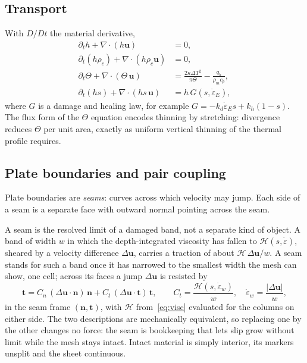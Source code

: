 \documentclass[11pt]{article}
\newcommand{\vect}[1]{\mathbf{#1}}
\newcommand{\edot}{\dot{\varepsilon}}
\newcommand{\Hint}{\mathcal{H}}
\begin{document}
\subsection{Transport}
With $D/Dt$ the material derivative,
\begin{align}
  \partial_t h + \nabla\cdot(h\vect{u}) &= 0,\\
  \partial_t (h\rho_c) + \nabla\cdot(h\rho_c\vect{u}) &= 0,\\
  \partial_t \Theta + \nabla\cdot(\Theta\,\vect{u}) &= \frac{2\kappa\Delta T^2}{\pi\Theta} - \frac{q_b}{\rho_m c_p},\\
  \partial_t (hs) + \nabla\cdot(hs\,\vect{u}) &= h\,G(s,\edot_E),
\end{align}
where $G$ is a damage and healing law, for example $G=-k_d\edot_E s+k_h(1-s)$. The flux form of the $\Theta$ equation encodes thinning by stretching: divergence reduces $\Theta$ per unit area, exactly as uniform vertical thinning of the thermal profile requires.

\subsection{Plate boundaries and pair coupling}
\label{sec:seams}
Plate boundaries are \emph{seams}: curves across which velocity may jump. Each side of a seam is a separate face with outward normal pointing across the seam.

A seam is the resolved limit of a damaged band, not a separate kind of object. A band of width $w$ in which the depth-integrated viscosity has fallen to $\Hint(s,\edot)$, sheared by a velocity difference $\Delta\vect u$, carries a traction of about $\Hint\,\Delta\vect u/w$. A seam stands for such a band once it has narrowed to the smallest width the mesh can show, one cell; across its faces a jump $\Delta\vect u$ is resisted by
\begin{equation}
  \vect{t} = C_n\,(\Delta\vect{u}\cdot\vect{n})\,\vect{n} + C_t\,(\Delta\vect{u}\cdot\vect{t})\,\vect{t},
  \qquad
  C_t = \frac{\Hint(s,\edot_w)}{w},\quad \edot_w = \frac{|\Delta\vect u|}{w},
  \label{eq:interface}
\end{equation}
in the seam frame $(\vect{n},\vect{t})$, with $\Hint$ from~\eqref{eq:visc} evaluated for the columns on either side. The two descriptions are mechanically equivalent, so replacing one by the other changes no force: the seam is bookkeeping that lets slip grow without limit while the mesh stays intact. Intact material is simply interior, its markers unsplit and the sheet continuous.
\end{document}
